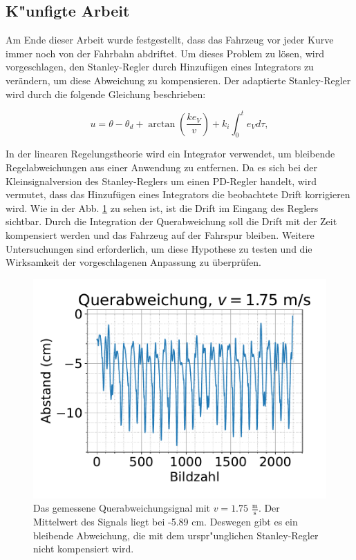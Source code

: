 \documentclass[arbeit=studie,oneside,BCOR=12mm]{ArbeitRST}
\begin{document}
\subsection{K"unfigte Arbeit}

Am Ende dieser Arbeit wurde festgestellt, dass das Fahrzeug vor jeder Kurve
immer noch von der Fahrbahn abdriftet. Um dieses Problem zu lösen, wird
vorgeschlagen, den Stanley-Regler durch Hinzufügen eines Integrators zu
verändern, um diese Abweichung zu kompensieren. Der adaptierte Stanley-Regler
wird durch die folgende Gleichung beschrieben:

\begin{equation}
    u = \theta - \theta_d + \arctan\left(\frac{ke_{V}}{v}\right) + k_{i} \int_{0}^{t} e_{V}d\tau,
    \label{eq:Stanley-Regler-adjusted}
\end{equation}

In der linearen Regelungstheorie wird ein Integrator verwendet, um bleibende
Regelabweichungen aus einer Anwendung zu entfernen. Da es sich bei der
Kleinsignalversion des Stanley-Reglers um einen PD-Regler handelt, wird
vermutet, dass das Hinzufügen eines Integrators die beobachtete Drift
korrigieren wird. Wie in der Abb. \ref{quer} zu sehen ist, ist die Drift im Eingang
des Reglers sichtbar. Durch die Integration der Querabweichung soll die Drift
mit der Zeit kompensiert werden und das Fahrzeug auf der Fahrspur bleiben.
Weitere Untersuchungen sind erforderlich, um diese Hypothese zu testen und die
Wirksamkeit der vorgeschlagenen Anpassung zu überprüfen.

\begin{figure}[h]
    \centering
    \includegraphics[scale=0.7]{querabweichung}
    \caption{Das gemessene Querabweichungsignal mit $v = 1.75$ $\frac{\mathrm{m}}{\mathrm{s}}$. Der Mittelwert
    des Signals liegt bei -5.89 cm. Deswegen gibt es ein bleibende Abweichung, die 
    mit dem urspr"unglichen Stanley-Regler nicht kompensiert wird.}
    \label{quer}
\end{figure}

\printbibliography
\end{document}
